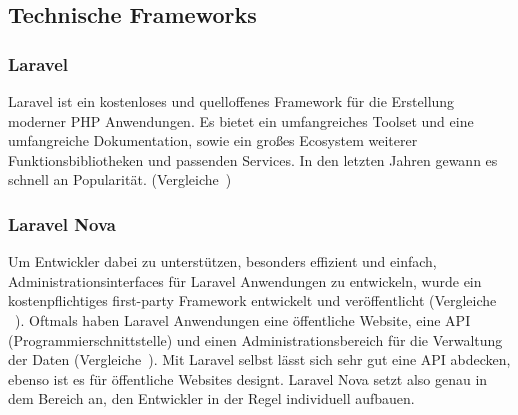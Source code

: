 \subsection{Technische Frameworks}

\subsubsection{Laravel}
Laravel ist ein kostenloses und quelloffenes Framework für die Erstellung moderner PHP Anwendungen.
Es bietet ein umfangreiches Toolset und eine umfangreiche Dokumentation, sowie ein großes Ecosystem weiterer Funktionsbibliotheken und passenden Services.
In den letzten Jahren gewann es schnell an Popularität.
(Vergleiche~\cite{what-is-laravel})

\subsubsection{Laravel Nova}
Um Entwickler dabei zu unterstützen, besonders effizient und einfach, Administrationsinterfaces für Laravel Anwendungen zu entwickeln, wurde ein kostenpflichtiges first-party Framework entwickelt und veröffentlicht (Vergleiche ~\cite{laravel-nova}).
Oftmals haben Laravel Anwendungen eine öffentliche Website, eine API (Programmierschnittstelle) und einen Administrationsbereich für die Verwaltung der Daten (Vergleiche~\cite{laravel-up-and-running}).
Mit Laravel selbst lässt sich sehr gut eine API abdecken, ebenso ist es für öffentliche Websites designt.
Laravel Nova setzt also genau in dem Bereich an, den Entwickler in der Regel individuell aufbauen.
